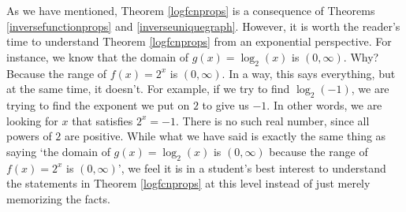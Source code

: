 \smallskip

As we have mentioned, Theorem \ref{logfcnprops} is a consequence of Theorems \ref{inversefunctionprops} and \ref{inverseuniquegraph}.  However, it is worth the reader's time to understand Theorem \ref{logfcnprops} from an exponential perspective.  For instance, we know that the domain of $g(x) = \log_{2}(x)$ is $(0,\infty)$.  Why?  Because the range of $f(x) = 2^{x}$ is $(0,\infty)$.  In a way, this says everything, but at the same time, it doesn't. For example, if we try to find $\log_{2}(-1)$, we are trying to find the exponent we put on $2$ to give us $-1$.  In other words, we are looking for $x$ that satisfies $2^{x} = -1$.  There is no such real number, since all powers of $2$ are positive.  While what we have said is exactly the same thing as saying `the domain of $g(x) = \log_{2}(x)$ is $(0,\infty)$ because the range of $f(x) = 2^{x}$ is $(0,\infty)$', we feel it is in a student's best interest to understand the statements in Theorem \ref{logfcnprops} at this level instead of just merely memorizing the facts.

